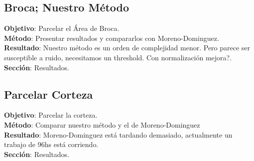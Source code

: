 \subsection{Broca; Nuestro M\'etodo}
\textbf{Objetivo}:  Parcelar el \'Area de Broca.\\
\textbf{M\'etodo}:  Presentar resultados y compararlos con Moreno-Dominguez. \\
\textbf{Resultado}: Nuestro m\'etodo es un orden de complejidad menor. Pero 
                    parece ser susceptible a ruido, necesitamos un
                    threshold. Con normalizaci\'on mejora?.\\
\textbf{Secci\'on}: Resultados.\\                    
                    
\subsection{Parcelar Corteza}
\textbf{Objetivo}:  Parcelar la corteza.\\
\textbf{M\'etodo}:  Comparar nuestro m\'etodo y el de Moreno-Dominguez \\
\textbf{Resultado}: Moreno-Dominguez est\'a tardando demasiado, actualmente un 
                    trabajo de 96hs est\'a corriendo.\\
\textbf{Secci\'on}: Resultados.\\                                        


